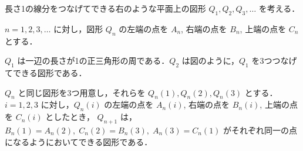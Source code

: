 \documentclass[../../main.tex]{subfiles}
\begin{document}
\newcommand{\drawTriangle}[3]{
  \draw (#1) -- (#2) -- (#3) -- cycle;
}

\newcommand{\recursiveTriangleQTwo}[4]{%
  \ifnum#4=0
  \drawTriangle{#1}{#2}{#3};
  \else
  \path let
  \p1 = (#1), \p2 = (#2), \p3 = (#3)
  in
  coordinate (MAB2) at ($ (\p1)!0.5!(\p2) $)
  coordinate (MBC2) at ($ (\p2)!0.5!(\p3) $)
  coordinate (MCA2) at ($ (\p3)!0.5!(\p1) $);
  \drawTriangle{#1}{#2}{#3};
  \drawTriangle{MAB2}{MBC2}{MCA2};
  \fi
}

\newcommand{\recursiveTriangleQThree}[3]{%
  \path let
  \p1 = (#1), \p2 = (#2), \p3 = (#3)
  in
  coordinate (MAB3) at ($ (\p1)!0.5!(\p2) $)
  coordinate (MBC3) at ($ (\p2)!0.5!(\p3) $)
  coordinate (MCA3) at ($ (\p3)!0.5!(\p1) $);
  \drawTriangle{#1}{#2}{#3};
  \drawTriangle{MAB3}{MBC3}{MCA3};
  \recursiveTriangleQTwo{#1}{MAB3}{MCA3}{1}
  \recursiveTriangleQTwo{MAB3}{#2}{MBC3}{1}
  \recursiveTriangleQTwo{MCA3}{MBC3}{#3}{1}
}

\newcommand{\recursiveTriangleQFour}[3]{%
  \path let
  \p1 = (#1), \p2 = (#2), \p3 = (#3)
  in
  coordinate (MAB4) at ($ (\p1)!0.5!(\p2) $)
  coordinate (MBC4) at ($ (\p2)!0.5!(\p3) $)
  coordinate (MCA4) at ($ (\p3)!0.5!(\p1) $);
  \drawTriangle{#1}{#2}{#3};
  \drawTriangle{MAB4}{MBC4}{MCA4};
  \recursiveTriangleQThree{#1}{MAB4}{MCA4}
  \recursiveTriangleQThree{MAB4}{#2}{MBC4}
  \recursiveTriangleQThree{MCA4}{MBC4}{#3}
}

長さ1の線分をつなげてできる右のような平面上の図形 $Q_1, Q_2, Q_3, \ldots$ を考える．

$n = 1, 2, 3, \ldots$ に対し，図形 $Q_n$ の左端の点を $A_n$, 右端の点を $B_n$, 上端の点を $C_n$ とする．

$Q_1$ は一辺の長さが1の正三角形の周である．$Q_2$ は図のように，$Q_1$ を3つつなげてできる図形である．

$Q_n$ と同じ図形を3つ用意し，それらを $Q_n(1), Q_n(2), Q_n(3)$ とする．
$i = 1, 2, 3$ に対し，$Q_n(i)$ の左端の点を $A_n(i)$, 右端の点を $B_n(i)$, 上端の点を $C_n(i)$ としたとき，
$Q_{n+1}$ は，$B_n(1) = A_n(2),\; C_n(2) = B_n(3),\; A_n(3) = C_n(1)$ がそれぞれ同一の点になるようにおいてできる図形である．
\end{document}
